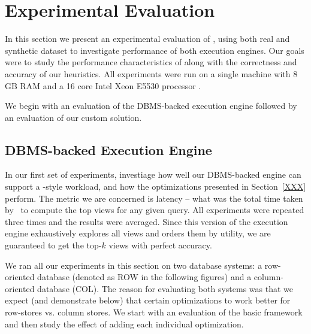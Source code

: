 \section{Experimental Evaluation}
\label{sec:experiments}

In this section we present an experimental evaluation of \VizRecDB, using
 both real and synthetic dataset to investigate performance of both \VizRecDB execution engines.
Our goals were to study the performance characteristics of \VizRecDB along with
the correctness and accuracy of our heuristics.
All experiments were run on a
single machine with 8 GB RAM and a 16 core Intel Xeon E5530 processor .

We begin with an evaluation of the DBMS-backed execution engine followed by an
evaluation of our custom solution.


\subsection{DBMS-backed Execution Engine}
\label{sec:expts_dbms_execution_engine}

In our first set of experiments, investiage how well our DBMS-backed engine
can support a \VizRecDB-style workload, and how the optimizations
presented in Section~\ref{XXX} perform.
The metric we are concerned is latency -- what was the total time taken by
\VizRecDB\ to compute the top views for any given query.
All experiments were repeated three times and the results were
averaged.
Since this version of the execution engine exhaustively explores all views and
 orders them by utility, we are guaranteed to get the top-$k$ views with
perfect accuracy.

We ran all our experiments in this section on two database systems: a
row-oriented database (denoted as ROW in the following figures) and a
column-oriented database (COL).
The reason for evaluating both systems was that we expect (and
demonstrate below) that certain optimizations to work better for row-stores vs.
column stores.
We start with an evaluation of the basic framework and then study the effect of
adding each individual optimization.

